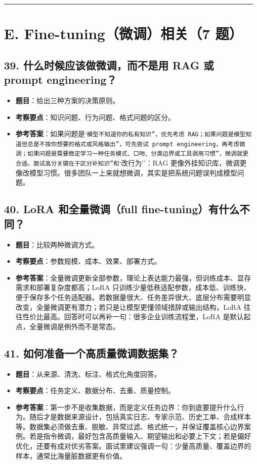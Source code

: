 \bigskip\hrule\bigskip

\section{E. Fine-tuning（微调）相关（7 题）}

\subsection{39. 什么时候应该做微调，而不是用 RAG 或 prompt engineering？}
\begin{itemize}[leftmargin=2em]
\item \textbf{题目}：给出三种方案的决策原则。
\item \textbf{考察要点}：知识问题、行为问题、格式问题的区分。
\item \textbf{参考答案}：如果问题是`\texttt{模型不知道你的私有知识''，优先考虑 RAG；如果问题是}\texttt{模型知道但总是不按你想要的格式或风格输出''，可先尝试 prompt engineering，再考虑微调；如果问题是}\texttt{需要稳定学习一种任务模式、口吻、分类边界或工具调用习惯''，微调就更合适。面试高分关键在于区分}\texttt{补知识''和}`改行为''：RAG 更像外挂知识库，微调更像改模型习惯。很多团队一上来就想微调，其实是把系统问题误判成模型问题。
\end{itemize}

\subsection{40. LoRA 和全量微调（full fine-tuning）有什么不同？}
\begin{itemize}[leftmargin=2em]
\item \textbf{题目}：比较两种微调方式。
\item \textbf{考察要点}：参数规模、成本、效果、部署方式。
\item \textbf{参考答案}：全量微调更新全部参数，理论上表达能力最强，但训练成本、显存需求和部署复杂度都高；LoRA 只训练少量低秩适配参数，成本低、训练快、便于保存多个任务适配器。若数据量很大、任务差异很大、底层分布需要明显改变，全量微调更有潜力；若只是让模型更懂领域措辞或输出结构，LoRA 往往性价比最高。回答时可以再补一句：很多企业训练流程里，LoRA 是默认起点，全量微调是例外而不是常态。
\end{itemize}

\subsection{41. 如何准备一个高质量微调数据集？}
\begin{itemize}[leftmargin=2em]
\item \textbf{题目}：从来源、清洗、标注、格式化角度回答。
\item \textbf{考察要点}：任务定义、数据分布、去重、质量控制。
\item \textbf{参考答案}：第一步不是收集数据，而是定义任务边界：你到底要提升什么行为。随后才是数据来源设计，包括真实日志、专家示范、历史工单、合成样本等。数据集必须做去重、脱敏、异常过滤、格式统一，并保证覆盖核心边界案例。若是指令微调，最好包含高质量输入、期望输出和必要上下文；若是偏好优化，还要有成对优劣答案。面试里建议强调一句：少量高质量、覆盖边界的样本，通常比海量脏数据更有价值。
\end{itemize}

